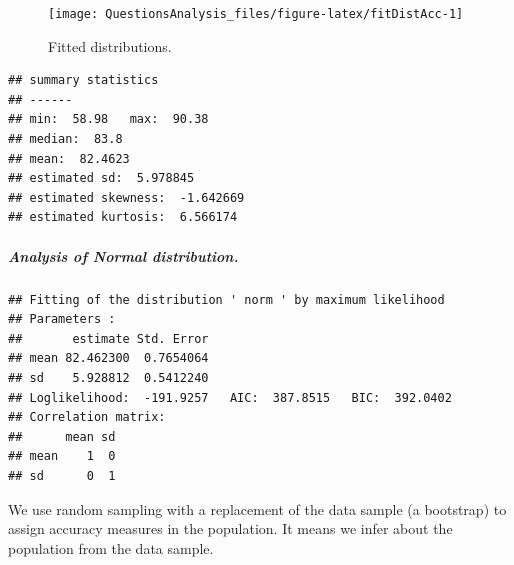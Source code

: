 \documentclass[
]{article}
\newenvironment{Shaded}{\begin{snugshade}}{\end{snugshade}}
\newcommand{\AttributeTok}[1]{\textcolor[rgb]{0.77,0.63,0.00}{#1}}
\newcommand{\DecValTok}[1]{\textcolor[rgb]{0.00,0.00,0.81}{#1}}
\newcommand{\FunctionTok}[1]{\textcolor[rgb]{0.00,0.00,0.00}{#1}}
\newcommand{\NormalTok}[1]{#1}
\newcommand{\OtherTok}[1]{\textcolor[rgb]{0.56,0.35,0.01}{#1}}
\newcommand{\SpecialCharTok}[1]{\textcolor[rgb]{0.00,0.00,0.00}{#1}}
\newcommand{\StringTok}[1]{\textcolor[rgb]{0.31,0.60,0.02}{#1}}
\begin{document}
\begin{figure}

{\centering \texttt{[image: QuestionsAnalysis\_files/figure-latex/fitDistAcc-1]} 

}

\caption{Fitted distributions.}\label{fig:fitDistAcc}
\end{figure}

\begin{verbatim}
## summary statistics
## ------
## min:  58.98   max:  90.38 
## median:  83.8 
## mean:  82.4623 
## estimated sd:  5.978845 
## estimated skewness:  -1.642669 
## estimated kurtosis:  6.566174
\end{verbatim}

\hypertarget{analysis-of-normal-distribution.}{%
\subparagraph{Analysis of Normal distribution.}\label{analysis-of-normal-distribution.}}

\begin{Shaded}
\end{Shaded}

\begin{verbatim}
## Fitting of the distribution ' norm ' by maximum likelihood 
## Parameters : 
##       estimate Std. Error
## mean 82.462300  0.7654064
## sd    5.928812  0.5412240
## Loglikelihood:  -191.9257   AIC:  387.8515   BIC:  392.0402 
## Correlation matrix:
##      mean sd
## mean    1  0
## sd      0  1
\end{verbatim}

We use random sampling with a replacement of the data sample (a bootstrap) to assign accuracy measures in the population. It means we infer about the population from the data sample.

\begin{Shaded}
\end{Shaded}
\end{document}
